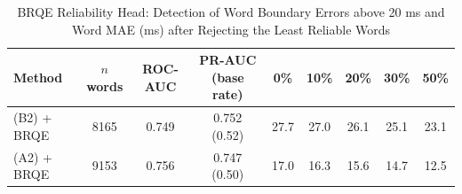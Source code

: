 \begin{table}[t]
\centering
\caption{BRQE Reliability Head: Detection of Word Boundary Errors above 20 ms and Word MAE (ms) after Rejecting the Least Reliable Words}
\label{tab:quality_estimation}
\begin{tabular}{lcccccccc}
\toprule
Method & \(n\) words & ROC-AUC & PR-AUC (base rate) & 0\% & 10\% & 20\% & 30\% & 50\% \\
\midrule
(B2) + BRQE & 8165 & 0.749 & 0.752 (0.52) & 27.7 & 27.0 & 26.1 & 25.1 & 23.1 \\
(A2) + BRQE & 9153 & 0.756 & 0.747 (0.50) & 17.0 & 16.3 & 15.6 & 14.7 & 12.5 \\
\bottomrule
\end{tabular}
\end{table}
